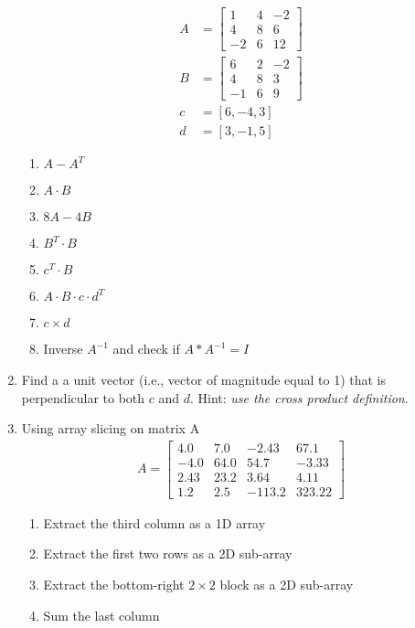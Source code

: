 \documentclass[a4paper,12pt]{article}
\begin{document}
\begin{enumerate}
	\begin{align*}
	A & =  \begin{bmatrix}
		1 & 4 & -2 \\
		4 & 8 & 6 \\
		-2 & 6 & 12 
    	\end{bmatrix} \\
	B & =  \begin{bmatrix}
	6 & 2 & -2 \\
	4 & 8 & 3 \\
	-1 & 6 & 9 
	\end{bmatrix} \\
	c & = \left[6, -4, 3\right]\\
	d & = \left[3, -1, 5\right]
	\end{align*}
	\begin{enumerate}
		\item $ A - A^T$
		\item $A \cdot B$
		\item $8A - 4B$
		\item $B^T \cdot B$
		\item $c^T \cdot B$
		\item $A\cdot B \cdot c \cdot d^T$
		\item $c \times d$
		\item Inverse $A^{-1}$ and check if $A * A^{-1} = I$
	\end{enumerate}
	\item Find a a unit vector (i.e., vector of magnitude equal to 1) that is perpendicular to both $c$ and $d$. Hint: \textit{use the cross product definition}.
	\item Using array slicing on matrix A
	\begin{align*}
	A = \begin{bmatrix}
4.0 & 7.0 & -2.43 & 67.1 \\
-4.0 & 64.0 & 54.7 & -3.33 \\
2.43 & 23.2 & 3.64 & 4.11 \\
1.2 & 2.5 & -113.2 & 323.22
	\end{bmatrix}
	\end{align*}
	\begin{enumerate}
		\item Extract the third column as a 1D array
		\item Extract the first two rows as a 2D sub-array
		\item Extract the bottom-right $2 \times 2$ block as a 2D sub-array
		\item Sum the last column
	\end{enumerate}
\end{enumerate}
\end{document}
